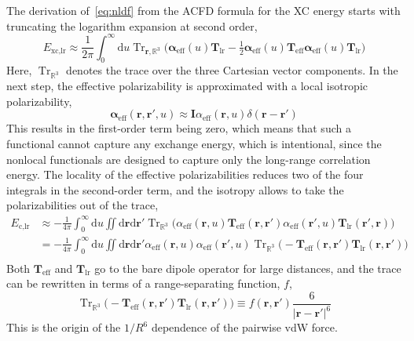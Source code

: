 The derivation of~\eqref{eq:nldf} from the ACFD formula for the XC energy starts with truncating the logarithm expansion at second order,
\begin{equation}
  E_\text{xc,lr}\approx
  \frac1{2\pi}\int_0^\infty\mathrm du\operatorname{Tr}_{\mathbf r,\mathbb R^3}\big(\boldsymbol\alpha_\text{eff}(u)\mathbf T_\text{lr}-\tfrac12\boldsymbol\alpha_\text{eff}(u)\mathbf T_\text{eff}\boldsymbol\alpha_\text{eff}(u)\mathbf T_\text{lr}\big)
\end{equation}
Here, $\operatorname{Tr}_{\mathbb R^3}$ denotes the trace over the three Cartesian vector components.
In the next step, the effective polarizability is approximated with a local isotropic polarizability,
\begin{equation}
  \boldsymbol\alpha_\text{eff}(\mathbf r,\mathbf r',u)\approx\mathbf I\alpha_\text{eff}(\mathbf r,u)\delta(\mathbf r-\mathbf r')
\end{equation}
This results in the first-order term being zero, which means that such a functional cannot capture any exchange energy, which is intentional, since the nonlocal functionals are designed to capture only the long-range correlation energy.
The locality of the effective polarizabilities reduces two of the four integrals in the second-order term, and the isotropy allows to take the polarizabilities out of the trace,
\begin{equation}
\begin{aligned}
  E_\text{c,lr}&\approx
  -\frac1{4\pi}\int_0^\infty\mathrm du\iint\mathrm d\mathbf r\mathrm d\mathbf r'\operatorname{Tr}_{\mathbb R^3}\big(\alpha_\text{eff}(\mathbf r,u)\mathbf T_\text{eff}(\mathbf r,\mathbf r')\alpha_\text{eff}(\mathbf r',u)\mathbf T_\text{lr}(\mathbf r',\mathbf r)\!\big) \\
  &=-\frac1{4\pi}\int_0^\infty\mathrm du\iint\mathrm d\mathbf r\mathrm d\mathbf r'\alpha_\text{eff}(\mathbf r,u)\alpha_\text{eff}(\mathbf r',u)\operatorname{Tr}_{\mathbb R^3}\big(-\mathbf T_\text{eff}(\mathbf r,\mathbf r')\mathbf T_\text{lr}(\mathbf r,\mathbf r')\!\big) \\
\end{aligned}
  \label{eq:acfd-nlc}
\end{equation}
Both $\mathbf T_\text{eff}$ and $\mathbf T_\text{lr}$ go to the bare dipole operator for large distances, and the trace can be rewritten in terms of a range-separating function, $f$,
\begin{equation}
\operatorname{Tr}_{\mathbb R^3}\big(-\mathbf T_\text{eff}(\mathbf r,\mathbf r')\mathbf T_\text{lr}(\mathbf r,\mathbf r')\!\big)\equiv f(\mathbf r,\mathbf r')\frac6{|\mathbf r-\mathbf r'|^6}
\label{eq:r6-func}
\end{equation}
This is the origin of the $1/R^6$ dependence of the pairwise vdW force.

